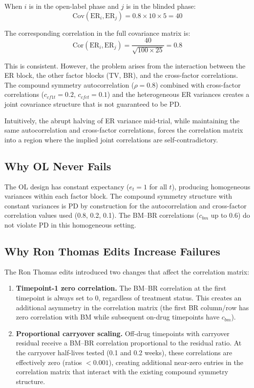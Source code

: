 \documentclass[11pt]{article}
\begin{document}
When $i$ is in the open-label phase and $j$ is in the blinded
phase:
\[
\text{Cov}(\text{ER}_i, \text{ER}_j) =
  0.8 \times 10 \times 5 = 40
\]

The corresponding correlation in the full covariance matrix is:
\[
\text{Cor}(\text{ER}_i, \text{ER}_j) =
  \frac{40}{\sqrt{100 \times 25}} = 0.8
\]

This is consistent. However, the problem arises from the
interaction between the ER block, the other factor blocks (TV,
BR), and the cross-factor correlations. The compound symmetry
autocorrelation ($\rho = 0.8$) combined with cross-factor
correlations ($c_{cf1t} = 0.2$, $c_{cfct} = 0.1$) and the
heterogeneous ER variances creates a joint covariance structure
that is not guaranteed to be PD.

Intuitively, the abrupt halving of ER variance mid-trial, while
maintaining the same autocorrelation and cross-factor
correlations, forces the correlation matrix into a region where
the implied joint correlations are self-contradictory.

\subsection{Why OL Never Fails}

The OL design has constant expectancy ($e_t = 1$ for all $t$),
producing homogeneous variances within each factor block. The
compound symmetry structure with constant variances is PD by
construction for the autocorrelation and cross-factor
correlation values used (0.8, 0.2, 0.1). The BM--BR
correlations ($c_{bm}$ up to 0.6) do not violate PD in this
homogeneous setting.

\subsection{Why Ron Thomas Edits Increase Failures}

The Ron Thomas edits introduced two changes that affect the
correlation matrix:

\begin{enumerate}
\item \textbf{Timepoint-1 zero correlation.} The BM--BR
  correlation at the first timepoint is always set to 0,
  regardless of treatment status. This creates an additional
  asymmetry in the correlation matrix (the first BR column/row
  has zero correlation with BM while subsequent on-drug
  timepoints have $c_{bm}$).

\item \textbf{Proportional carryover scaling.} Off-drug
  timepoints with carryover residual receive a BM--BR
  correlation proportional to the residual ratio. At the
  carryover half-lives tested (0.1 and 0.2 weeks), these
  correlations are effectively zero (ratios $< 0.001$),
  creating additional near-zero entries in the correlation
  matrix that interact with the existing compound symmetry
  structure.
\end{enumerate}
\end{document}

